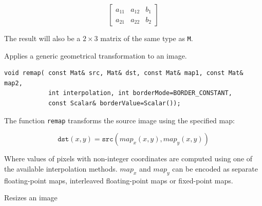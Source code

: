 \[\begin{bmatrix}
a_11 & a_12 & b_1 \\
a_21 & a_22 & b_2
\end{bmatrix}
\]

The result will also be a $2 \times 3$ matrix of the same type as \texttt{M}.

\label{remap}
Applies a generic geometrical transformation to an image.

\begin{lstlisting}
void remap( const Mat& src, Mat& dst, const Mat& map1, const Mat& map2,
            int interpolation, int borderMode=BORDER_CONSTANT,
            const Scalar& borderValue=Scalar());
\end{lstlisting}
\begin{description}
\end{description}

The function \texttt{remap} transforms the source image using the specified map:

\[
\texttt{dst}(x,y) = \texttt{src}(map_x(x,y),map_y(x,y))
\]

Where values of pixels with non-integer coordinates are computed using one of the available interpolation methods. $map_x$ and $map_y$ can be encoded as separate floating-point maps, interleaved floating-point maps or fixed-point maps.

\label{resize}
Resizes an image

